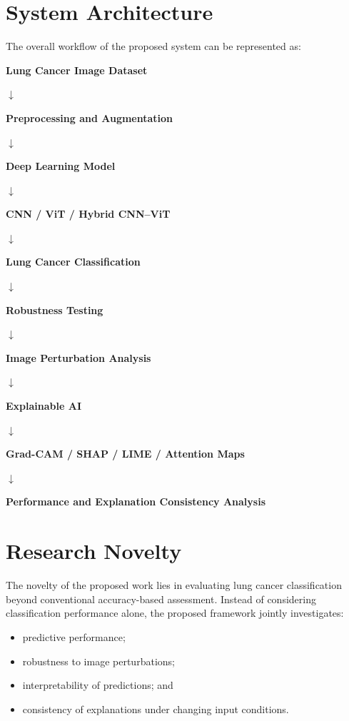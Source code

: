 \documentclass[12pt,a4paper]{article}
\begin{document}
\section{System Architecture}

The overall workflow of the proposed system can be represented as:

\begin{center}
\textbf{Lung Cancer Image Dataset}

$\downarrow$

\textbf{Preprocessing and Augmentation}

$\downarrow$

\textbf{Deep Learning Model}

$\downarrow$

\textbf{CNN / ViT / Hybrid CNN--ViT}

$\downarrow$

\textbf{Lung Cancer Classification}

$\downarrow$

\textbf{Robustness Testing}

$\downarrow$

\textbf{Image Perturbation Analysis}

$\downarrow$

\textbf{Explainable AI}

$\downarrow$

\textbf{Grad-CAM / SHAP / LIME / Attention Maps}

$\downarrow$

\textbf{Performance and Explanation Consistency Analysis}
\end{center}

\section{Research Novelty}

The novelty of the proposed work lies in evaluating lung cancer classification beyond conventional accuracy-based assessment. Instead of considering classification performance alone, the proposed framework jointly investigates:

\begin{itemize}
    \item predictive performance;
    \item robustness to image perturbations;
    \item interpretability of predictions; and
    \item consistency of explanations under changing input conditions.
\end{itemize}
\end{document}
